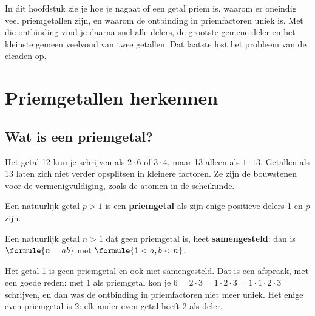 In dit hoofdstuk zie je hoe je nagaat of een getal priem is, waarom er oneindig veel priemgetallen zijn, en waarom de ontbinding in priemfactoren uniek is. Met die ontbinding vind je daarna snel alle delers, de grootste gemene deler en het kleinste gemeen veelvoud van twee getallen. Dat laatste lost het probleem van de cicaden op.

\begin{oefeningen}[Start]

\end{oefeningen}


\section{Priemgetallen herkennen}

\subsection{Wat is een priemgetal?}

Het getal 12 kun je schrijven als $2 \cdot 6$ of $3 \cdot 4$, maar 13 alleen als $1 \cdot 13$. Getallen als 13 laten zich niet verder opsplitsen in kleinere factoren. Ze zijn de bouwstenen voor de vermenigvuldiging, zoals de atomen in de scheikunde.

\begin{theorie}
Een natuurlijk getal $p > 1$ is een \textbf{\textcolor{accent}{priemgetal}} als zijn enige positieve delers 1 en $p$ zijn.

\vspace{1mm}
Een natuurlijk getal $n > 1$ dat geen priemgetal is, heet \textbf{\textcolor{accent}{samengesteld}}: dan is $\formule{n = ab}$ met $\formule{1 < a, b < n}$.
\end{theorie}

Het getal 1 is geen priemgetal en ook niet samengesteld. Dat is een afspraak, met een goede reden: met 1 als priemgetal kon je $6 = 2 \cdot 3 = 1 \cdot 2 \cdot 3 = 1 \cdot 1 \cdot 2 \cdot 3$ schrijven, en dan was de ontbinding in priemfactoren niet meer uniek. Het enige even priemgetal is 2: elk ander even getal heeft 2 als deler.

